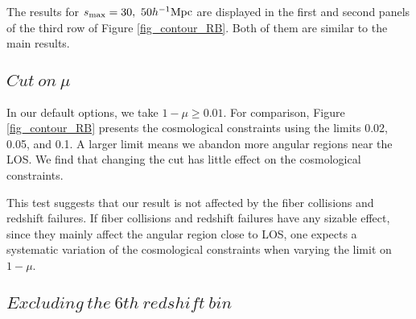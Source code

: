 \documentclass[iop]{emulateapj}
\begin{document}
The results for $s_{\rm max}=30,\ 50 h^{-1}{\rm Mpc}$ are displayed in the first and second panels of the third row of Figure \ref{fig_contour_RB}.
Both of them are similar to the main results.




\subsection{$Cut\ on\ \mu$}

In our default options, we take $1 - \mu\ge0.01$.
For comparison, Figure \ref{fig_contour_RB} presents the cosmological constraints using the limits 
0.02, 0.05, and 0.1.
A larger limit means we abandon more angular regions near the LOS.
We find that changing the cut has little effect on the cosmological constraints.

This test suggests that our result is not affected by the fiber collisions and redshift failures.
If fiber collisions and redshift failures have any sizable effect,
since they mainly affect the angular region close to LOS,
one expects a systematic variation of the cosmological constraints when varying the limit on $1-\mu$.

\subsection{$Excluding\ the\ 6th\ redshift\ bin$}
\end{document}
